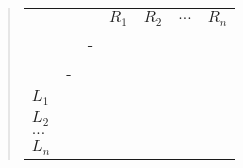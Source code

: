 \begin{quote}
    \begin{table}[H]
        \centering
        \begin{tabular}{lllllll}
            \cellcolor[HTML]{FFFFFF}\textit{}      &                        & \cellcolor[HTML]{FFFFFF}\textit{}                      & \cellcolor[HTML]{FFFFFF}\textit{$R_1$}                 & \cellcolor[HTML]{FFFFFF}\textit{$R_2$}                 & \cellcolor[HTML]{FFFFFF}\textit{$\dots$}               & \cellcolor[HTML]{FFFFFF}\textit{$R_n$}                 \\
                                                   &                        & -                                                      &                                                        &                                                        &                                                        &                                                        \\ \cline{3-7} 
            \cellcolor[HTML]{FFFFFF}\textit{}      & \multicolumn{1}{l|}{-} & \multicolumn{1}{l|}{\cellcolor[HTML]{FFFFFF}\textit{}} & \multicolumn{1}{l|}{\cellcolor[HTML]{FFFFFF}\textit{}} & \multicolumn{1}{l|}{\cellcolor[HTML]{FFFFFF}\textit{}} & \multicolumn{1}{l|}{\cellcolor[HTML]{FFFFFF}\textit{}} & \multicolumn{1}{l|}{\cellcolor[HTML]{FFFFFF}\textit{}} \\ \cline{3-7} 
            \cellcolor[HTML]{FFFFFF}\textit{$L_1$} & \multicolumn{1}{l|}{}  & \multicolumn{1}{l|}{\cellcolor[HTML]{FFFFFF}\textit{}} & \multicolumn{1}{l|}{\cellcolor[HTML]{FFFFFF}\textit{}} & \multicolumn{1}{l|}{\cellcolor[HTML]{FFFFFF}\textit{}} & \multicolumn{1}{l|}{\cellcolor[HTML]{FFFFFF}\textit{}} & \multicolumn{1}{l|}{\cellcolor[HTML]{FFFFFF}\textit{}} \\ \cline{3-7} 
            $L_2$                                  & \multicolumn{1}{l|}{}  & \multicolumn{1}{l|}{}                                  & \multicolumn{1}{l|}{}                                  & \multicolumn{1}{l|}{}                                  & \multicolumn{1}{l|}{}                                  & \multicolumn{1}{l|}{}                                  \\ \cline{3-7} 
            $\dots$                                & \multicolumn{1}{l|}{}  & \multicolumn{1}{l|}{}                                  & \multicolumn{1}{l|}{}                                  & \multicolumn{1}{l|}{}                                  & \multicolumn{1}{l|}{}                                  & \multicolumn{1}{l|}{}                                  \\ \cline{3-7} 
            \cellcolor[HTML]{FFFFFF}\textit{$L_n$} & \multicolumn{1}{l|}{}  & \multicolumn{1}{l|}{\cellcolor[HTML]{FFFFFF}\textit{}} & \multicolumn{1}{l|}{\cellcolor[HTML]{FFFFFF}\textit{}} & \multicolumn{1}{l|}{\cellcolor[HTML]{FFFFFF}\textit{}} & \multicolumn{1}{l|}{\cellcolor[HTML]{FFFFFF}\textit{}} & \multicolumn{1}{l|}{\cellcolor[HTML]{FFFFFF}\textit{}} \\ \cline{3-7} 
            \end{tabular}
    \end{table}


\end{quote}
